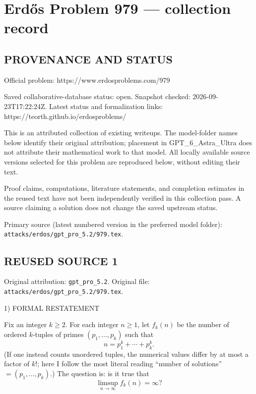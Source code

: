 \section*{Erd\H{o}s Problem 979 --- collection record}

\subsection*{PROVENANCE AND STATUS}
Official problem: https://www.erdosproblems.com/979

Saved collaborative-database status: open.
Snapshot checked: 2026-09-23T17:22:24Z.
Latest status and formalization links: https://teorth.github.io/erdosproblems/

This is an attributed collection of existing writeups. The model-folder names below identify their original attribution; placement in GPT\_6\_Astra\_Ultra does not attribute their mathematical work to that model. All locally available source versions selected for this problem are reproduced below, without editing their text.

Proof claims, computations, literature statements, and completion estimates in the reused text have not been independently verified in this collection pass. A source claiming a solution does not change the saved upstream status.

Primary source (latest numbered version in the preferred model folder): \texttt{attacks/erdos/gpt\_pro\_5.2/979.tex}.

\subsection*{REUSED SOURCE 1}
Original attribution: \texttt{gpt\_pro\_5.2}.
Original file: \texttt{attacks/erdos/gpt\_pro\_5.2/979.tex}.


1) FORMAL RESTATEMENT

Fix an integer $k\ge 2$. For each integer $n\ge 1$, let $f_k(n)$ be the number of ordered $k$-tuples
of primes $(p_1,\dots,p_k)$ such that
\[
n=p_1^k+\cdots+p_k^k.
\]
(If one instead counts unordered tuples, the numerical values differ by at most a factor of $k!$; here I follow the most literal reading ``number of solutions'' $=(p_1,\dots,p_k)$.)
The question is: is it true that
\[
\limsup_{n\to\infty} f_k(n)=\infty?
\]

